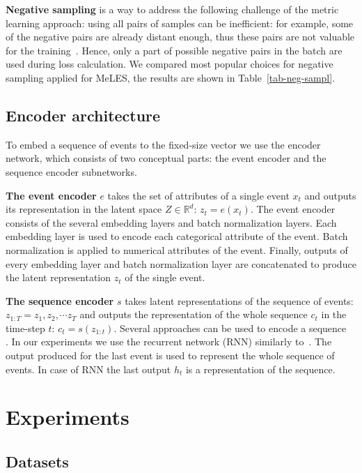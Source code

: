 \documentclass{article}
\newcommand{\R}{\mathbb{R}}
\begin{document}
\textbf{Negative sampling} is a way to address the following challenge of the metric learning approach: using all pairs of samples can be inefficient: for example, some of the negative pairs are already distant enough, thus these pairs are not valuable for the training~\cite{SimoSerra2015DiscriminativeLO, Manmatha2017SamplingMI, Schroff2015FaceNetAU}. Hence, only a part of possible negative pairs in the batch are used during loss calculation. We compared most popular choices for negative sampling applied for MeLES, the results are shown in Table~\ref{tab-neg-sampl}.

\subsection{Encoder architecture} \label{sec-enc-arch}

To embed a sequence of events to the fixed-size vector we use the encoder network, which consists of two conceptual parts: the event encoder and the sequence encoder subnetworks.

\textbf{The event encoder} $e$ takes the set of attributes of a single event $x_t$ and outputs its representation in the latent space $Z \in \R^d$: $z_t = e(x_t)$.
The event encoder consists of the several embedding layers and batch normalization layers. Each embedding layer is used to encode each categorical attribute of the event. Batch normalization is applied to numerical attributes of the event. Finally, outputs of every embedding layer and batch normalization layer are concatenated to produce the latent representation $z_t$ of the single event.

\textbf{The sequence encoder} $s$ takes latent representations of the sequence of events: $ z_{1:T} = z_1, z_2, \cdots z_T $ and outputs the representation of the whole sequence $c_t$ in the time-step $t$: $ c_t = s(z_{1:t}) $.
Several approaches can be used to encode a sequence~\cite{Cho2014LearningPR, Vaswani2017AttentionIA} . In our experiments we use the recurrent network (RNN) similarly to~\cite{Sutskever2014SequenceTS}. The output produced for the last event is used to represent the whole sequence of events. In case of RNN the last output $h_t$ is a representation of the sequence.

\section{Experiments} \label{sec-exp}

\subsection{Datasets} \label{sec-datasets}
\end{document}
